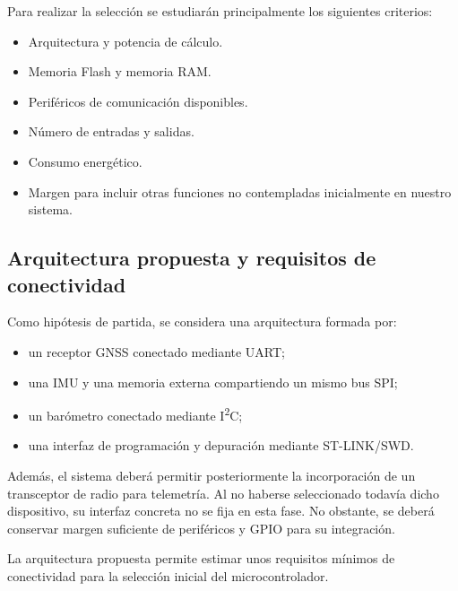 \documentclass[11pt,a4paper]{article}
\begin{document}
Para realizar la selección se estudiarán principalmente los siguientes criterios:
\begin{itemize}

    \item Arquitectura y potencia de cálculo.
    \item Memoria Flash y memoria RAM\@.
    \item Periféricos de comunicación disponibles.
    \item Número de entradas y salidas.
    \item Consumo energético.
    \item Margen para incluir otras funciones no contempladas inicialmente en nuestro sistema.

\end{itemize}

\subsection{Arquitectura propuesta y requisitos de conectividad}

Como hipótesis de partida, se considera una arquitectura formada por:

\begin{itemize}

    \item un receptor GNSS conectado mediante UART\@;

    \item una IMU y una memoria externa compartiendo un mismo bus SPI\@;

    \item un barómetro conectado mediante I\textsuperscript{2}C\@;

    \item una interfaz de programación y depuración mediante ST-LINK/SWD\@.

\end{itemize}

Además, el sistema deberá permitir posteriormente la incorporación de un
transceptor de radio para telemetría. Al no haberse seleccionado todavía
dicho dispositivo, su interfaz concreta no se fija en esta fase. No
obstante, se deberá conservar margen suficiente de periféricos y GPIO
para su integración.

La arquitectura propuesta permite estimar unos requisitos mínimos de
conectividad para la selección inicial del microcontrolador.
\end{document}
